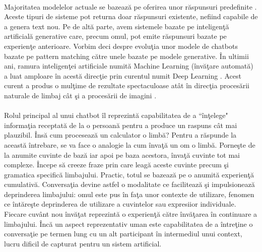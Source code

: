 \paragraph{}
Majoritatea modelelor actuale se bazeaz\u a pe oferirea unor r\u aspunsuri predefinite \cite{chatbot-models}. Aceste tipuri de sisteme pot returna doar r\u aspunsuri existente, nefiind capabile de a genera text nou. Pe de alt\u a parte, avem sistemele bazate pe inteligen\c t\u a artificial\u a generative \cite{chatbot-models} care, precum omul, pot emite r\u aspunsuri bazate pe experien\c te anterioare. Vorbim deci despre evolu\c tia unor modele de chatbots bazate pe pattern matching c\u atre unele bazate pe modele generative. \^ In ultimii ani, ramura inteligen\c tei artificiale numit\u a Machine Learning  (\^ inv\u a\c tare automat\u a) a luat amploare \^ in acest\u a direc\c tie prin curentul numit Deep Learning \cite{Goodfellow-et-al-2016}. Acest curent a produs o mul\c time de rezultate spectaculoase at\^ at \^ in direc\c tia proces\u arii naturale de limbaj c\^ at \c si a proces\u arii de imagini \cite{deep-learning-advancements}.

\paragraph{}
Rolul principal al unui chatbot \^ il reprezint\u a capabilitatea de a ``\^ in\c telege" informa\c tia receptat\u a de la o persoan\u a pentru a produce un raspuns c\^ at mai plauzibil. \^ Ins\u a cum proceseaz\u a un calculator o limb\u a? Pentru a r\u aspunde la aceast\u a \^ intrebare, se va face o analogie la cum \^ inva\c t\u a un om o limb\u a. Porne\c ste de la anumite cuvinte de baz\u a iar apoi pe baza acestora, \^ inva\c t\u a cuvinte tot mai complexe. \^ Incepe s\u a creeze fraze prin care leag\u a aceste cuvinte precum \c si gramatica specific\u a limbajului. Practic, totul se bazeaz\u a pe o anumit\u a experien\c t\u a cumulativ\u a. Conversa\c tia devine astfel o modalitate ce faciliteaz\u a \c si impulsioneaz\u a deprinderea limbajului: omul este pus \^ in fa\c ta unor contexte de utilizare, fenomen ce \^ int\u are\c ste deprinderea de utilizare a cuvintelor sau expresiior individuale. Fiecare cuv\^ ant nou \^ inv\u a\c tat reprezint\u a o experien\c t\u a c\u atre \^ inv\u a\c tarea \^ in continuare a limbajului. \^ Inc\u a un aspect reprezentativ uman este capabilitatea de a \^ intre\c tine o conversa\c tie pe termen lung cu un alt participant \^ in intermediul unui context, lucru dificil de capturat pentru un sistem artificial.

